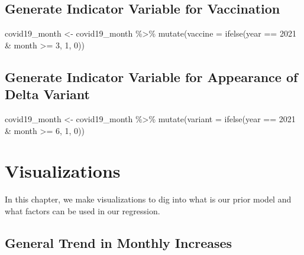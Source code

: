 \documentclass[
]{book}
\newenvironment{Shaded}{\begin{snugshade}}{\end{snugshade}}
\newcommand{\AttributeTok}[1]{\textcolor[rgb]{0.77,0.63,0.00}{#1}}
\newcommand{\DecValTok}[1]{\textcolor[rgb]{0.00,0.00,0.81}{#1}}
\newcommand{\FunctionTok}[1]{\textcolor[rgb]{0.00,0.00,0.00}{#1}}
\newcommand{\NormalTok}[1]{#1}
\newcommand{\OtherTok}[1]{\textcolor[rgb]{0.56,0.35,0.01}{#1}}
\newcommand{\SpecialCharTok}[1]{\textcolor[rgb]{0.00,0.00,0.00}{#1}}
\begin{document}
\hypertarget{generate-indicator-variable-for-vaccination}{%
\section{Generate Indicator Variable for Vaccination}\label{generate-indicator-variable-for-vaccination}}

\begin{Shaded}
\begin{Highlighting}[]
\NormalTok{covid19\_month }\OtherTok{\textless{}{-}}\NormalTok{ covid19\_month }\SpecialCharTok{\%\textgreater{}\%}
  \FunctionTok{mutate}\NormalTok{(}\AttributeTok{vaccine =} \FunctionTok{ifelse}\NormalTok{(year }\SpecialCharTok{==} \DecValTok{2021} \SpecialCharTok{\&}\NormalTok{ month }\SpecialCharTok{\textgreater{}=} \DecValTok{3}\NormalTok{, }\DecValTok{1}\NormalTok{, }\DecValTok{0}\NormalTok{))}
\end{Highlighting}
\end{Shaded}

\hypertarget{generate-indicator-variable-for-appearance-of-delta-variant}{%
\section{Generate Indicator Variable for Appearance of Delta Variant}\label{generate-indicator-variable-for-appearance-of-delta-variant}}

\begin{Shaded}
\begin{Highlighting}[]
\NormalTok{covid19\_month }\OtherTok{\textless{}{-}}\NormalTok{ covid19\_month }\SpecialCharTok{\%\textgreater{}\%}
  \FunctionTok{mutate}\NormalTok{(}\AttributeTok{variant =} \FunctionTok{ifelse}\NormalTok{(year }\SpecialCharTok{==} \DecValTok{2021} \SpecialCharTok{\&}\NormalTok{ month }\SpecialCharTok{\textgreater{}=} \DecValTok{6}\NormalTok{, }\DecValTok{1}\NormalTok{, }\DecValTok{0}\NormalTok{))}
\end{Highlighting}
\end{Shaded}

\hypertarget{visualizations}{%
\chapter{Visualizations}\label{visualizations}}

In this chapter, we make visualizations to dig into what is our prior model and what factors can be used in our regression.

\hypertarget{general-trend-in-monthly-increases}{%
\section{General Trend in Monthly Increases}\label{general-trend-in-monthly-increases}}
\end{document}
